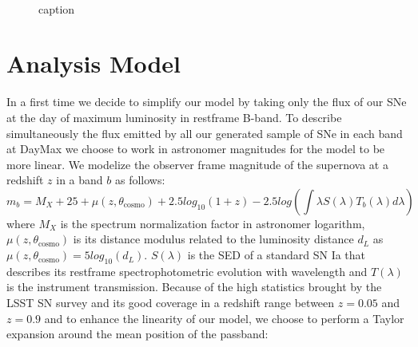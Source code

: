 \documentclass[\docopts]{\docclass}
\begin{document}
\begin{figure}[t]
\begin{center}
\\
\caption{caption}
\label{fig:sigmas}
\end{center}
\end{figure}


\section{Analysis Model}
\label{sec::analysis_model}

In a first time we decide to simplify our model by taking only the flux of our SNe at the day of maximum luminosity in restframe B-band.
To describe simultaneously the flux emitted by all our generated sample of SNe in each band at DayMax we choose to work in astronomer magnitudes for the model to be more linear.
We modelize the observer frame magnitude of the supernova at a redshift $z$ in a band $b$ as follows:
\begin{equation}
\label{eq::raw_model}
 m_b = M_X + 25 + \mu(z, \theta_\text{cosmo}) + 2.5log_{10}(1+z) - 2.5log(\int \lambda S(\lambda) T_b(\lambda) d\lambda) 
\end{equation}
where $M_X$ is the spectrum normalization factor in astronomer logarithm, $\mu(z, \theta_\text{cosmo})$ is its distance modulus related to the luminosity distance $d_L$ as $\mu(z, \theta_\text{cosmo}) = 5log_{10}(d_L)$.
$S(\lambda)$ is the SED of a standard SN Ia that describes its restframe spectrophotometric evolution with wavelength and $T(\lambda)$ is the instrument transmission.
Because of the high statistics brought by the LSST SN survey and its good coverage in a redshift range between $z=0.05$ and $z=0.9$ and to enhance the linearity of our model, we choose to perform a Taylor expansion around the mean position of the passband:
\end{document}
